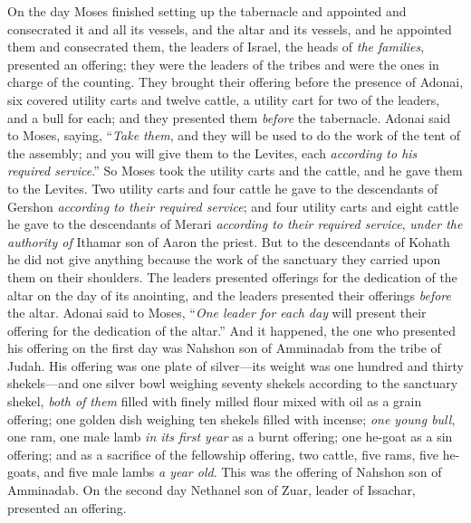 \begin{biblechapter} %
 On the day Moses finished setting up the tabernacle and appointed and consecrated it and all its vessels, and the altar and its vessels, and he appointed them and consecrated them,
\verse the leaders of Israel, the heads of \textit{the families}, presented an offering; they were the leaders of the tribes and were the ones in charge of the counting.
\verse They brought their offering before the presence of Adonai, six covered utility carts and twelve cattle, a utility cart for two of the leaders, and a bull for each; and they presented them \textit{before} the tabernacle.
\verse Adonai said to Moses, saying,
\verse “\textit{Take them}, and they will be used to do the work of the tent of the assembly; and you will give them to the Levites, each \textit{according to his required service}.”
\verse So Moses took the utility carts and the cattle, and he gave them to the Levites.
\verse Two utility carts and four cattle he gave to the descendants of Gershon \textit{according to their required service};
\verse and four utility carts and eight cattle he gave to the descendants of Merari \textit{according to their required service}, \textit{under the authority of} Ithamar son of Aaron the priest.
\verse But to the descendants of Kohath he did not give anything because the work of the sanctuary they carried upon them on their shoulders.
\verse The leaders presented offerings for the dedication of the altar on the day of its anointing, and the leaders presented their offerings \textit{before} the altar.
\verse Adonai said to Moses, “\textit{One leader for each day} will present their offering for the dedication of the altar.”
\verse And it happened, the one who presented his offering on the first day was Nahshon son of Amminadab from the tribe of Judah.
\verse His offering was one plate of silver—its weight was one hundred and thirty shekels—and one silver bowl weighing seventy shekels according to the sanctuary shekel, \textit{both of them} filled with finely milled flour mixed with oil as a grain offering;
\verse one golden dish weighing ten shekels filled with incense;
\verse \textit{one young bull}, one ram, one male lamb \textit{in its first year} as a burnt offering;
\verse one he-goat as a sin offering;
\verse and as a sacrifice of the fellowship offering, two cattle, five rams, five he-goats, and five male lambs \textit{a year old}. This was the offering of Nahshon son of Amminadab.
\verse On the second day Nethanel son of Zuar, leader of Issachar, presented an offering.

\end{biblechapter}
